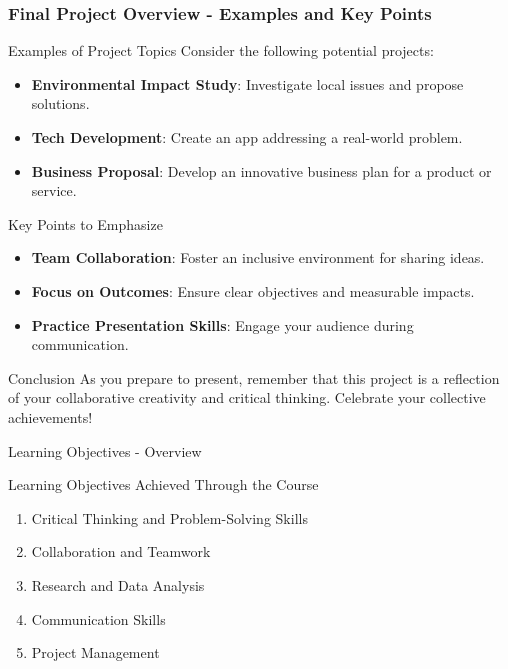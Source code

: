 \documentclass[aspectratio=169]{beamer}
\begin{document}
\begin{frame}[fragile]
    \frametitle{Final Project Overview - Examples and Key Points}
    \begin{block}{Examples of Project Topics}
        Consider the following potential projects:
        \begin{itemize}
            \item \textbf{Environmental Impact Study}: Investigate local issues and propose solutions.
            \item \textbf{Tech Development}: Create an app addressing a real-world problem.
            \item \textbf{Business Proposal}: Develop an innovative business plan for a product or service.
        \end{itemize}
    \end{block}
    \begin{block}{Key Points to Emphasize}
        \begin{itemize}
            \item \textbf{Team Collaboration}: Foster an inclusive environment for sharing ideas.
            \item \textbf{Focus on Outcomes}: Ensure clear objectives and measurable impacts.
            \item \textbf{Practice Presentation Skills}: Engage your audience during communication.
        \end{itemize}
    \end{block}
    \begin{block}{Conclusion}
        As you prepare to present, remember that this project is a reflection of your collaborative 
        creativity and critical thinking. Celebrate your collective achievements!
    \end{block}
\end{frame}

\begin{frame}[fragile]{Learning Objectives - Overview}
    \begin{block}{Learning Objectives Achieved Through the Course}
        \begin{enumerate}
            \item Critical Thinking and Problem-Solving Skills
            \item Collaboration and Teamwork
            \item Research and Data Analysis
            \item Communication Skills
            \item Project Management
        \end{enumerate}
    \end{block}
\end{frame}
\end{document}
